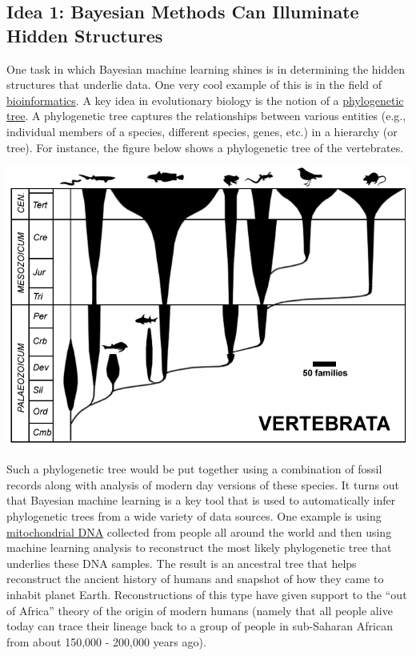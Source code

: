\documentclass[assignment01_Solutions]{subfiles}
\begin{document}
\subsection*{Idea 1: Bayesian Methods Can Illuminate Hidden Structures}

One task in which Bayesian machine learning shines is in determining the hidden structures that underlie data.  One very cool example of this is in the field of \href{https://en.wikipedia.org/wiki/Bioinformatics}{bioinformatics}.  A key idea in evolutionary biology is the notion of a \href{https://en.wikipedia.org/wiki/Phylogenetic_tree}{phylogenetic tree}.  A phylogenetic tree captures the relationships between various entities (e.g., individual members of a species, different species, genes, etc.) in a hierarchy (or tree).  For instance, the figure below shows a phylogenetic tree of the vertebrates.

\begin{center}
\includegraphics[width=0.8\linewidth]{figures/vertebrates}
\end{center}

Such a phylogenetic tree would be put together using a combination of fossil records along with analysis of modern day versions of these species.  It turns out that Bayesian machine learning is a key tool that is used to automatically infer phylogenetic trees from a wide variety of data sources.  One example is using \href{https://en.wikipedia.org/wiki/Mitochondrial_DNA}{mitochondrial DNA} collected from people all around the world and then using machine learning analysis to reconstruct the most likely phylogenetic tree that underlies these DNA samples.  The result is an ancestral tree that helps reconstruct the ancient history of humans and snapshot of how they came to inhabit planet Earth.  Reconstructions of this type have given support to the ``out of Africa'' theory of the origin of modern humans (namely that all people alive today can trace their lineage back to a group of people in sub-Saharan African from about 150,000 - 200,000 years ago).
\end{document}
